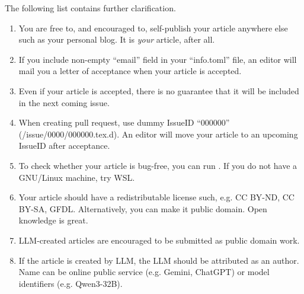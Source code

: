 The following list contains further clarification.

\begin{enumerate}
	\item You are free to, and encouraged to, self-publish your article anywhere else such as your personal blog.
	      It is \emph{your} article, after all.
	\item If you include non-empty ``email'' field in your ``info.toml'' file,
	      an editor will mail you a letter of acceptance when your article is accepted.
	\item Even if your article is accepted, there is no guarantee that it will be included in the next coming issue.
	\item When creating pull request, use dummy IssueID ``000000'' (/issue/0000/000000.tex.d).
	      An editor will move your article to an upcoming IssueID after acceptance.
	\item To check whether your article is bug-free, you can run .
	      If you do not have a GNU/Linux machine, try WSL.
	\item Your article should have a redistributable license such, e.g. CC BY-ND, CC BY-SA, GFDL. Alternatively, you can make it public domain.
	      Open knowledge is great.
	\item LLM-created articles are encouraged to be submitted as public domain work.
	\item If the article is created by LLM, the LLM should be attributed as an author.
	      Name can be online public service (e.g. Gemini, ChatGPT)
	      or model identifiers (e.g. Qwen3-32B).
\end{enumerate}



